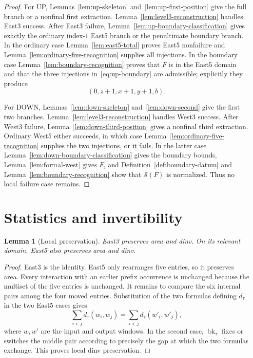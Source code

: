 \documentclass[11pt]{article}
\newtheorem{lemma}[theorem]{Lemma}
\theoremstyle{definition}
\theoremstyle{remark}
\newcommand{\bk}{\operatorname{bk}}
\newcommand{\Save}{\mathcal S}
\begin{document}
\begin{proof}
For UP, Lemmas~\ref{lem:up-skeleton} and~\ref{lem:up-first-position} give the
full branch or a nonfinal first extraction.  Lemma~\ref{lem:level3-reconstruction}
handles East3 success.  After East3 failure,
Lemma~\ref{lem:up-boundary-classification} gives exactly the ordinary
index-$1$ East5 branch or the penultimate boundary branch.  In the ordinary
case Lemma~\ref{lem:east5-total} proves East5 nonfailure and
Lemma~\ref{lem:ordinary-five-recognition} supplies all injections.  In the
boundary case Lemma~\ref{lem:boundary-recognition} proves that $F$ is in the
East5 domain and that the three injections in~\eqref{eq:up-boundary} are
admissible; explicitly they produce
\[
  (0,z+1,x+1,y+1,b).
\]

For DOWN, Lemmas~\ref{lem:down-skeleton} and~\ref{lem:down-second} give the
first two branches.  Lemma~\ref{lem:level3-reconstruction} handles West3
success.  After West3 failure,
Lemma~\ref{lem:down-third-position} gives a nonfinal third extraction.
Ordinary West5 either succeeds, in which case
Lemma~\ref{lem:ordinary-five-recognition} supplies the two injections, or it
fails.  In the latter case Lemma~\ref{lem:down-boundary-classification}
gives the boundary bounds, Lemma~\ref{lem:formal-west} gives $F$, and
Definition~\ref{def:boundary-datum} and
Lemma~\ref{lem:boundary-recognition} show that $\Save(F)$ is normalized.
Thus no local failure case remains.
\end{proof}

\section{Statistics and invertibility}

\begin{lemma}[Local preservation]
\label{lem:local-preservation}
East3 preserves area and dinv.  On its relevant domain, East5 also preserves
area and dinv.
\end{lemma}

\begin{proof}
East3 is the identity.  East5 only rearranges five entries, so it preserves
area.  Every interaction with an earlier prefix occurrence is unchanged
because the multiset of the five entries is unchanged.  It remains to compare
the six internal pairs among the four moved entries.  Substitution of the
two formulas defining $d_\tau$ in the two East5 cases gives
\[
  \sum_{i<j}d_\tau(w_i,w_j)
  =\sum_{i<j}d_\tau(w'_i,w'_j),
\]
where $w,w'$ are the input and output windows.  In the second case,
$\bk_\tau$ fixes or switches the middle pair according to precisely the gap
at which the two formulas exchange.  This proves local dinv preservation.
\end{proof}
\end{document}
